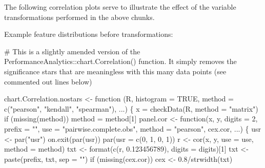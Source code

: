 \documentclass[
  letterpaper,
  DIV=11,
  numbers=noendperiod]{scrreprt}
\newenvironment{Shaded}{\begin{snugshade}}{\end{snugshade}}
\newcommand{\AttributeTok}[1]{\textcolor[rgb]{0.40,0.45,0.13}{#1}}
\newcommand{\CommentTok}[1]{\textcolor[rgb]{0.37,0.37,0.37}{#1}}
\newcommand{\ConstantTok}[1]{\textcolor[rgb]{0.56,0.35,0.01}{#1}}
\newcommand{\ControlFlowTok}[1]{\textcolor[rgb]{0.00,0.23,0.31}{#1}}
\newcommand{\DecValTok}[1]{\textcolor[rgb]{0.68,0.00,0.00}{#1}}
\newcommand{\FloatTok}[1]{\textcolor[rgb]{0.68,0.00,0.00}{#1}}
\newcommand{\FunctionTok}[1]{\textcolor[rgb]{0.28,0.35,0.67}{#1}}
\newcommand{\NormalTok}[1]{\textcolor[rgb]{0.00,0.23,0.31}{#1}}
\newcommand{\OtherTok}[1]{\textcolor[rgb]{0.00,0.23,0.31}{#1}}
\newcommand{\SpecialCharTok}[1]{\textcolor[rgb]{0.37,0.37,0.37}{#1}}
\newcommand{\StringTok}[1]{\textcolor[rgb]{0.13,0.47,0.30}{#1}}
\begin{document}
The following correlation plots serve to illustrate the effect of the
variable transformations performed in the above chunks.

Example feature distributions before transformations:

\begin{Shaded}
\begin{Highlighting}[]
\CommentTok{\# This is a slightly amended version of the PerformanceAnalytics::chart.Correlation() function. It simply removes the significance stars that are meaningless with this many data points (see commented out lines below)}

\NormalTok{chart.Correlation.nostars }\OtherTok{\textless{}{-}} \ControlFlowTok{function}\NormalTok{ (R, }\AttributeTok{histogram =} \ConstantTok{TRUE}\NormalTok{, }\AttributeTok{method =} \FunctionTok{c}\NormalTok{(}\StringTok{"pearson"}\NormalTok{, }\StringTok{"kendall"}\NormalTok{, }\StringTok{"spearman"}\NormalTok{), ...) \{}
\NormalTok{  x }\OtherTok{=} \FunctionTok{checkData}\NormalTok{(R, }\AttributeTok{method =} \StringTok{"matrix"}\NormalTok{)}
  \ControlFlowTok{if}\NormalTok{ (}\FunctionTok{missing}\NormalTok{(method)) }
\NormalTok{    method }\OtherTok{=}\NormalTok{ method[}\DecValTok{1}\NormalTok{]}
\NormalTok{  panel.cor }\OtherTok{\textless{}{-}} \ControlFlowTok{function}\NormalTok{(x, y, }\AttributeTok{digits =} \DecValTok{2}\NormalTok{, }\AttributeTok{prefix =} \StringTok{""}\NormalTok{, }\AttributeTok{use =} \StringTok{"pairwise.complete.obs"}\NormalTok{, }\AttributeTok{method =} \StringTok{"pearson"}\NormalTok{, cex.cor, ...) \{}
\NormalTok{    usr }\OtherTok{\textless{}{-}} \FunctionTok{par}\NormalTok{(}\StringTok{"usr"}\NormalTok{)}
    \FunctionTok{on.exit}\NormalTok{(}\FunctionTok{par}\NormalTok{(usr))}
    \FunctionTok{par}\NormalTok{(}\AttributeTok{usr =} \FunctionTok{c}\NormalTok{(}\DecValTok{0}\NormalTok{, }\DecValTok{1}\NormalTok{, }\DecValTok{0}\NormalTok{, }\DecValTok{1}\NormalTok{))}
\NormalTok{    r }\OtherTok{\textless{}{-}} \FunctionTok{cor}\NormalTok{(x, y, }\AttributeTok{use =}\NormalTok{ use, }\AttributeTok{method =}\NormalTok{ method)}
\NormalTok{    txt }\OtherTok{\textless{}{-}} \FunctionTok{format}\NormalTok{(}\FunctionTok{c}\NormalTok{(r, }\FloatTok{0.123456789}\NormalTok{), }\AttributeTok{digits =}\NormalTok{ digits)[}\DecValTok{1}\NormalTok{]}
\NormalTok{    txt }\OtherTok{\textless{}{-}} \FunctionTok{paste}\NormalTok{(prefix, txt, }\AttributeTok{sep =} \StringTok{""}\NormalTok{)}
    \ControlFlowTok{if}\NormalTok{ (}\FunctionTok{missing}\NormalTok{(cex.cor)) }
\NormalTok{      cex }\OtherTok{\textless{}{-}} \FloatTok{0.8}\SpecialCharTok{/}\FunctionTok{strwidth}\NormalTok{(txt)}

\end{Highlighting}
\end{Shaded}
\end{document}
